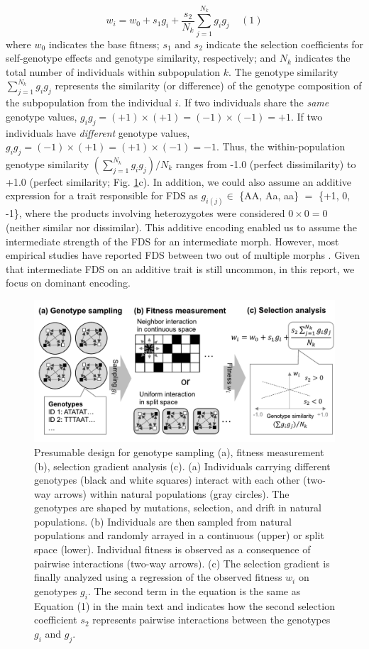\documentclass[12pt,]{article}
\begin{document}
$$w_i = w_0 + s_1 g_i + \frac{s_2}{N_k}\sum^{N_{k}}_{j=1}{g_ig_j}~~~~~(1)$$
where $w_0$ indicates the base fitness; $s_1$ and $s_2$ indicate the selection coefficients for self-genotype effects and genotype similarity, respectively; and $N_k$ indicates the total number of individuals within subpopulation $k$. The genotype similarity $\sum^{N_{k}}_{j=1}{g_ig_j}$ represents the similarity (or difference) of the genotype composition of the subpopulation from the individual $i$. If two individuals share the \textit{same} genotype values, $g_ig_j = (+1)\times(+1) = (-1)\times(-1) = +1$. If two individuals have \textit{different} genotype values, $g_ig_j = (-1)\times(+1) = (+1)\times(-1) = -1$. Thus, the within-population genotype similarity $(\sum^{N_{k}}_{j=1}{g_ig_j})/N_k$ ranges from -1.0 (perfect dissimilarity) to +1.0 (perfect similarity; Fig. \ref{fig1:scheme}c). In addition, we could also assume an additive expression for a trait responsible for FDS as $g_{i(j)} \in$ \{AA, Aa, aa\} $=$ \{+1, 0, -1\}, where the products involving heterozygotes were considered $0 \times 0 = 0$ (neither similar nor dissimilar). This additive encoding enabled us to assume the intermediate strength of the FDS for an intermediate morph. However, most empirical studies have reported FDS between two out of multiple morphs \citep[for example,][]{gigord2001negative,takahashi2010negative,le2015evolutionary,sato2017herbivore,nosil2018natural}. Given that intermediate FDS on an additive trait is still uncommon, in this report, we focus on dominant encoding.

\begin{figure}[ht]
  \includegraphics[width=\linewidth]{Fig1_scheme.pdf}
  \caption{Presumable design for genotype sampling (a), fitness measurement (b), selection gradient analysis (c). (a) Individuals carrying different genotypes (black and white squares) interact with each other (two-way arrows) within natural populations (gray circles). The genotypes are shaped by mutations, selection, and drift in natural populations. (b) Individuals are then sampled from natural populations and randomly arrayed in a continuous (upper) or split space (lower). Individual fitness is observed as a consequence of pairwise interactions (two-way arrows). (c) The selection gradient is finally analyzed using a regression of the observed fitness $w_i$ on genotypes $g_i$. The second term in the equation is the same as Equation (1) in the main text and indicates how the second selection coefficient $s_2$ represents pairwise interactions between the genotypes $g_i$ and $g_j$.
}
  \label{fig1:scheme}
\end{figure}
\end{document}
